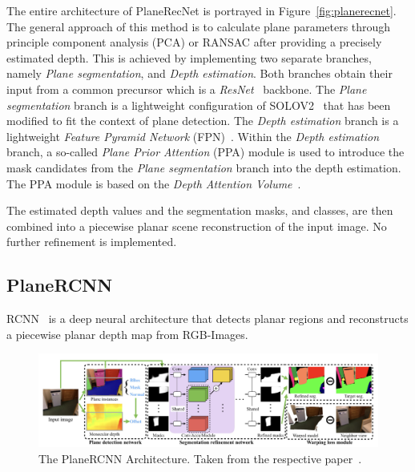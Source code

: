 \documentclass[main.tex]{subfiles}
\begin{document}
The entire architecture of PlaneRecNet is portrayed in Figure~\ref{fig:planerecnet}.
The general approach of this method is to calculate plane parameters through principle component analysis (PCA) or RANSAC
after providing a precisely estimated depth.
This is achieved by implementing two separate branches, namely \textit{Plane segmentation}, and \textit{Depth estimation}.
Both branches obtain their input from a common precursor which is a \textit{ResNet}~\cite{He_Zhang_Ren_Sun_2015} backbone.
The \textit{Plane segmentation} branch is a lightweight configuration of SOLOV2~\cite{wang2020solov2} that has been modified to
fit the context of plane detection.
The \textit{Depth estimation} branch is a lightweight \textit{Feature Pyramid Network} (FPN)~\cite{Lin_Dollár_Girshick_He_Hariharan_Belongie_2017}.
Within the \textit{Depth estimation} branch, a so-called \textit{Plane Prior Attention} (PPA) module is used to introduce
the mask candidates from the \textit{Plane segmentation} branch into the depth estimation. The PPA module is based
on the \textit{Depth Attention Volume}~\cite{Huynh_Nguyen-Ha_Matas_Rahtu_Heikkila_2020}.

The estimated depth values and the segmentation masks, and classes, are then combined into a piecewise planar
scene reconstruction of the input image. No further refinement is implemented.

\subsection{PlaneRCNN}
\label{subsec:bg-planercnn}
RCNN~\cite{Liu_Kim_Gu_Furukawa_Kautz_2019} is a deep neural architecture that detects planar
regions and reconstructs a piecewise planar depth map from RGB-Images.

\begin{figure}[H]
    \centering
    \includegraphics[width=\textwidth]{images/planercnn.png}
    \caption[PlaneRCNN Architecture]{The PlaneRCNN Architecture. Taken from the respective paper~\cite[Figure~2]{Liu_Kim_Gu_Furukawa_Kautz_2019}.}
    \label{fig:planercnn}
\end{figure}
\end{document}
